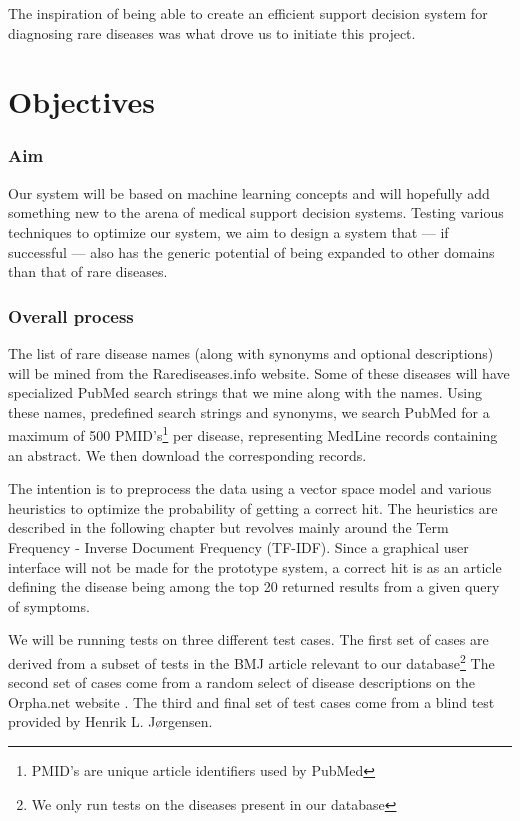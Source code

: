 The inspiration of being able to create an efficient support decision
system for diagnosing rare diseases was what drove us to initiate this
project.

\section{Objectives}

\subsubsection{Aim}
Our system will be based on machine learning concepts and will
hopefully add something new to the arena of medical support decision
systems. Testing various techniques to optimize our system, we aim to
design a system that --- if successful --- also has the generic potential of
being expanded to other domains than that of rare diseases.

\subsubsection{Overall process}
The list of rare disease names (along with synonyms and optional
descriptions) will be mined from the Rarediseases.info website. Some
of these diseases will have specialized PubMed search strings that we
mine along with the names. Using these names, predefined search
strings and synonyms, we search PubMed for a maximum of 500
PMID's\footnote{PMID's are unique article identifiers used by PubMed}
per disease, representing MedLine records containing an abstract. We
then download the corresponding records.

The intention is to preprocess the data using a vector space model and
various heuristics to optimize the probability of getting a correct
hit. The heuristics are described in the following chapter but
revolves mainly around the Term Frequency - Inverse Document Frequency
(TF-IDF). Since a graphical user interface will not be made for the
prototype system, a correct hit is as an article defining the disease
being among the top 20 returned results from a given query of
symptoms.

We will be running tests on three different test cases. The first set
of cases are derived from a subset of tests in the BMJ article
\cite{HangwiTang11102006} relevant to our database\footnote{We only
  run tests on the diseases present in our database} The second set of
cases come from a random select of disease descriptions on the
Orpha.net website \cite{Orphanet}. The third and final set of test
cases come from a blind test provided by Henrik L. J\o rgensen.

